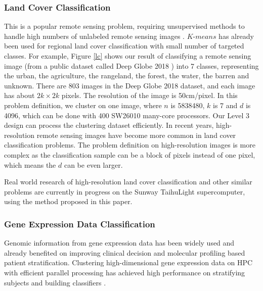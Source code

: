 \documentclass[10pt,journal,compsoc]{IEEEtran}
\begin{document}
{\subsubsection{Land Cover Classification}
This is a popular remote sensing problem, requiring unsupervised methods to handle high numbers of unlabeled remote sensing images \cite{li2016stacked}.
$K$-$means$ has already been used for regional land cover classification with small number of targeted classes. For example, Figure \ref{lc} shows our result of classifying a remote sensing image (from a public dataset called Deep Globe 2018 \cite{demir2018deepglobe}) into 7 classes, representing the urban, the agriculture, the rangeland, the forest, the water, the barren and unknown. There are 803 images in the Deep Globe 2018 dataset, and each image has about $2k \times 2k$ pixels. The resolution of the image is 50cm/pixel. In this problem definition, we cluster on one image, where $n$ is 5838480, $k$ is 7 and $d$ is 4096, which can be done with 400 SW26010 many-core processors. Our Level 3 design can process the clustering dataset efficiently. 
In recent years, high-resolution remote sensing images have become more common in land cover classification problems. The problem definition on high-resolution images is more complex as the classification sample can be a block of pixels instead of one pixel, which means the $d$ can be even larger.

Real world research of high-resolution land cover classification and other similar problems are currently in progress on the Sunway TaihuLight supercomputer, using the method proposed in this paper. 

\subsubsection{Gene Expression Data Classification}
Genomic information from gene expression data has been widely used and already benefited on improving clinical decision and molecular profiling based patient stratification. Clustering high-dimensional gene expression data on HPC with efficient parallel processing has achieved high performance on stratifying subjects and building classifiers \cite{wang2014optimising}. 

}
\end{document}
